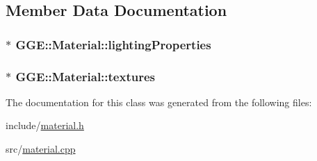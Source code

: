 \subsection{Member Data Documentation}
\hypertarget{class_g_g_e_1_1_material_acdd2f61d60cb734b5ee28397ee77c3c3}{
\subsubsection[{lighting\+Properties}]{$\ast$ G\+G\+E\+::\+Material\+::lighting\+Properties\hspace{0.3cm}{\ttfamily [private]}}}\label{class_g_g_e_1_1_material_acdd2f61d60cb734b5ee28397ee77c3c3}
\hypertarget{class_g_g_e_1_1_material_a2f8ced3599abf933e28c9f70a879e4e0}{
\subsubsection[{textures}]{$\ast$ G\+G\+E\+::\+Material\+::textures\hspace{0.3cm}{\ttfamily [private]}}}\label{class_g_g_e_1_1_material_a2f8ced3599abf933e28c9f70a879e4e0}


The documentation for this class was generated from the following files\+:\begin{DoxyCompactItemize}
\item 
include/\hyperlink{material_8h}{material.\+h}\item 
src/\hyperlink{material_8cpp}{material.\+cpp}\end{DoxyCompactItemize}
